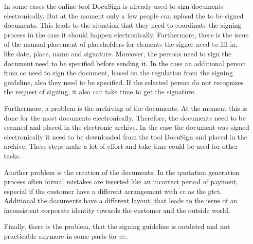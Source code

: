 In some cases the online tool DocuSign is already used to sign documents electronically. But at the moment only a few people can upload the to be signed documents. This leads to the situation that they need to coordinate the signing process in the case it should happen electronically. Furthermore, there is the issue of the manual placement of placeholders for elements the signer need to fill in, like date, place, name and signature. Moreover, the persons need to sign the document need to be specified before sending it. In the case an additional person from \gls{cc} need to sign the document, based on the regulation from the signing guideline, also they need to be specified. If the selected person do not recognizes the request of signing, it also can take time to get the signature.

Furthermore, a problem is the archiving of the documents. At the moment this is done for the most documents electronically. Therefore, the documents need to be scanned and placed in the electronic archive. In the case the document was signed electronically it need to be downloaded from the tool DocuSign and placed in the archive. These steps make a lot of effort and take time could be used for other tasks.

Another problem is the creation of the documents. In the quotation generation process often formal mistakes are inserted like an incorrect period of payment, especial if the customer have a different arrangement with \gls{cc} as the \gls{gtct}. Additional the documents have a different layout, that leads to the issue of an inconsistent corporate identity towards the customer and the outside world.

Finally, there is the problem, that the signing guideline is outdated and not practicable anymore in some parts for \gls{cc}. 
